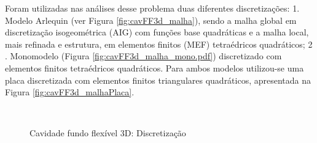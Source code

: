 Foram utilizadas nas análises desse problema duas diferentes discretizações: 1. Modelo Arlequin (ver Figura \ref{fig:cavFF3d_malha}), sendo a malha global em discretização isogeométrica (AIG) com funções base quadráticas e a malha local, mais refinada e estrutura, em elementos finitos (MEF) tetraédricos quadráticos; 2 . Monomodelo (Figura \ref{fig:cavFF3d_malha_mono.pdf}) discretizado com elementos finitos tetraédricos quadráticos. Para ambos modelos utilizou-se uma placa discretizada com elementos finitos triangulares quadráticos, apresentada na Figura \ref{fig:cavFF3d_malhaPlaca}.

\begin{figure}[!htbp]
	\caption{Cavidade fundo flexível 3D: Discretização}
	\centering
	 \ 
	 \\

\end{figure}

